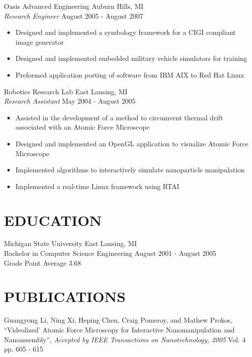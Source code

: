 \documentclass[line]{res}
\begin{document}
\begin{resume}
    \vspace{-2mm}
    Oasis Advanced Engineering \hfill Auburn Hills, MI\\
    {\sl Research Engineer} \hfill August 2005 - August 2007
    \vspace{1mm}
    \begin{itemize}
      \item Designed and implemented a symbology framework for a CIGI compliant image generator
      \item Designed and implemented embedded military vehicle simulators for training
      \item Preformed application porting of software from IBM AIX to Red Hat Linux 
    \end{itemize}

    \vspace{-2mm}
    Robotics Research Lab \hfill East Lansing, MI\\
    {\sl Research Assistant} \hfill May 2004 - August 2005
    \vspace{1mm}
    \begin{itemize}
      \item Assisted in the development of a method to circumvent thermal drift associated with an Atomic Force Microscope
      \item Designed and implemented an OpenGL application to visualize Atomic Force Microscope
      \item Implemented algorithms to interactively simulate nanoparticle manipulation
      \item Implemented a real-time Linux framework using RTAI
    \end{itemize}

\section{EDUCATION}
\vspace{1mm}
   Michigan State University \hfill East Lansing, MI\\
   Bachelor in Computer Science Engineering \hfill August 2001 - August 2005\\
   Grade Point Average 3.68\\

\vspace{-5mm}
\section{PUBLICATIONS}
   \vspace{1mm}
   Guangyong Li, Ning Xi, Heping Chen, Craig Pomeroy, and Mathew Prokos,
   ``Videolized' Atomic Force Microscopy for Interactive Nanomanipulation and Nanoassembly'',
   \textsl{Accepted by IEEE Transactions on Nanotechnology, 2005} Vol. 4 pp. 605 - 615


\end{resume}
\end{document}
